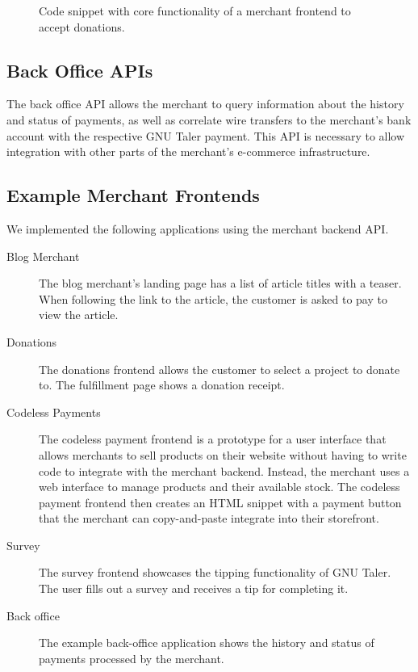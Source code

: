 \begin{figure}

\caption[Code snippet for merchant frontend]{Code snippet with core functionality of a merchant frontend to accept donations.}
\label{fig:merchant-donations-code}
\end{figure}


\subsection{Back Office APIs}
The back office API allows the merchant to query information about the history
and status of payments, as well as correlate wire transfers to the merchant's
bank account with the respective GNU Taler payment.  This API is necessary to
allow integration with other parts of the merchant's e-commerce infrastructure.


\subsection{Example Merchant Frontends}
We implemented the following applications using the merchant backend API.

\begin{description}
  \item[Blog Merchant] The blog merchant's landing page has a list of article titles with a teaser.
    When following the link to the article, the customer is asked to pay to view the article.
  \item[Donations]  The donations frontend allows the customer to select a project to donate to.
    The fulfillment page shows a donation receipt.
  \item[Codeless Payments]  The codeless payment frontend is a prototype for a
    user interface that allows merchants to sell products on their website
    without having to write code to integrate with the merchant backend.
    Instead, the merchant uses a web interface to manage products and their
    available stock.  The codeless payment frontend then creates an HTML snippet with a payment
    button that the merchant can copy-and-paste integrate into their storefront.
  \item[Survey]  The survey frontend showcases the tipping functionality of GNU Taler.
    The user fills out a survey and receives a tip for completing it.
  \item[Back office] The example back-office application shows the history and
    status of payments processed by the merchant.
\end{description}

